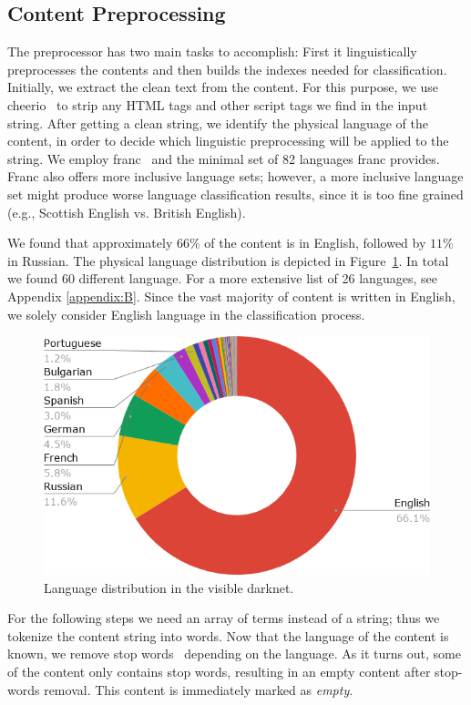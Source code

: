 \subsection{Content Preprocessing}
The preprocessor has two main tasks to accomplish: First it linguistically preprocesses the contents and then builds the indexes needed for classification. 
Initially, we extract the clean text from the content.
For this purpose, we use cheerio~\cite{cheeriojs} to strip any HTML tags and other script tags we find in the input string.
After getting a clean string, we identify the physical language of the content, in order to decide which linguistic preprocessing will be applied to the string.
We employ franc~\cite{WormerFranc} and the minimal set of 82 languages franc provides. Franc also offers more inclusive language sets; however, a more inclusive language set might produce worse language classification results, since it is too fine grained (e.g., Scottish English vs. British English).

We found that approximately $66\%$ of the content is in English, followed by $11\%$ in Russian. The physical language distribution is depicted in Figure~\ref{fig:languages}. In total we found 60 different language. For a more extensive list of 26 languages, see Appendix \ref{appendix:B}. Since the vast majority of content is written in English, we solely consider English language in the classification process.

\begin{figure}[H]
\includegraphics[width=\linewidth]{images/contentsByLanguage.png}
\caption{Language distribution in the visible darknet.}
\label{fig:languages}
\end{figure}
For the following steps we need an array of terms instead of a string; thus we tokenize the content string into words.
Now that the language of the content is known, we remove stop words~\cite{McDowall} depending on the language. As it turns out, some of the content only contains stop words, resulting in an empty content after stop-words removal. This content is immediately marked as \emph{empty}.

